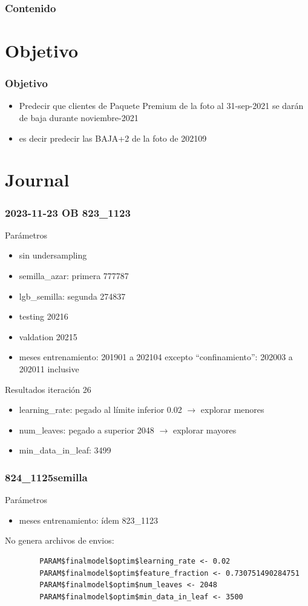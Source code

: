 \documentclass[aspectratio=43]{beamer}
\begin{document}
\begin{frame}
	\frametitle{Contenido}
	\tableofcontents
\end{frame}

\section{Objetivo}

\begin{frame}
	\frametitle{Objetivo}
	\begin{itemize}
		\item Predecir que clientes de Paquete Premium de la foto al 31-sep-2021 se darán de baja durante noviembre-2021
		\item es decir predecir las BAJA+2 de la foto de 202109
	\end{itemize}
\end{frame}

\section{Journal}

\begin{frame}
	\frametitle{2023-11-23 OB 823\_1123}
	Parámetros
	\begin{itemize}
		\item sin undersampling
		\item semilla\_azar: primera 777787
		\item lgb\_semilla: segunda 274837
		\item testing 20216
		\item valdation 20215
		\item meses entrenamiento: 201901 a 202104 excepto ``confinamiento'': 202003 a 202011 inclusive
	\end{itemize}
	Resultados iteración 26
	\begin{itemize}
		\item learning\_rate: pegado al límite inferior 0.02  \(\rightarrow\) explorar menores
		\item num\_leaves: pegado a superior 2048 \(\rightarrow\) explorar mayores
		\item min\_data\_in\_leaf: 3499 
	\end{itemize}
\end{frame}


\begin{frame}
	\frametitle{824\_1125semilla}
	Parámetros
	\begin{itemize}
		\item meses entrenamiento: ídem 823\_1123
	\end{itemize}
	No genera archivos de envios:
	\begin{verbatim}
		PARAM$finalmodel$optim$learning_rate <- 0.02
		PARAM$finalmodel$optim$feature_fraction <- 0.730751490284751	
		PARAM$finalmodel$optim$num_leaves <- 2048
		PARAM$finalmodel$optim$min_data_in_leaf <- 3500
	\end{verbatim}
\end{frame}
\end{document}
